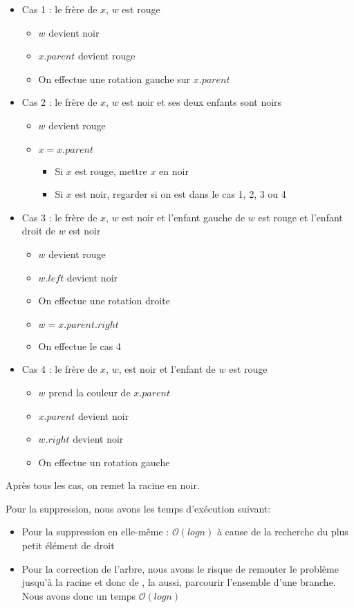 \documentclass[11pt]{article}
\begin{document}
\begin{itemize}
	\item Cas 1 : le frère de $x$, $w$ est rouge
	\begin{itemize}
		\item $w$ devient noir
		\item $x.parent$ devient rouge
		\item On effectue une rotation gauche sur $x.parent$
	\end{itemize}
	\item Cas 2 : le frère de $x$, $w$ est noir et ses deux enfants sont noirs
	\begin{itemize}
		\item $w$ devient rouge
		\item $x = x.parent$
		\begin{itemize}
			\item Si $x$ est rouge, mettre $x$ en noir
			\item Si $x$ est noir, regarder si on est dans le cas 1, 2, 3 ou 4
		\end{itemize}
	\end{itemize}
	\item Cas 3 : le frère de $x$, $w$ est noir et l'enfant gauche de $w$ est rouge et l'enfant droit de $w$ est noir
	\begin{itemize}
		\item $w$ devient rouge
		\item $w.left$ devient noir
		\item On effectue une rotation droite
		\item $w = x.parent.right$
		\item On effectue le cas 4
	\end{itemize}
	\item Cas 4 : le frère de $x$, $w$, est noir et l'enfant de $w$ est rouge
	\begin{itemize}
		\item $w$ prend la couleur de $x.parent$
		\item $x.parent$ devient noir
		\item $w.right$ devient noir
		\item On effectue un rotation gauche
	\end{itemize}
\end{itemize}

Après tous les cas, on remet la racine en noir.

Pour la suppression, nous avons les temps d'exécution suivant:

\begin{itemize}
	\item Pour la suppression en elle-même : $\mathcal{O}(log n)$ à cause de la recherche du plus petit élément de droit
	\item Pour la correction de l'arbre, nous avons le risque de remonter le problème jusqu'à la racine et donc de , la aussi, parcourir l'ensemble d'une branche. Nous avons donc un temps $\mathcal{O}(log n)$
\end{itemize}
\end{document}
